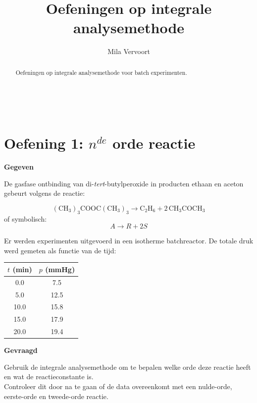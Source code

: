 \documentclass{ximera}
\title{Oefeningen op integrale analysemethode}
\author{Mila Vervoort}
\begin{document}
\begin{abstract}
    Oefeningen op integrale analysemethode voor batch experimenten.
\end{abstract}
\maketitle
\label{xim:oefeningen integrale analysemethode}

\
\section*{Oefening 1: $n^{de}$ orde reactie}

\textbf{Gegeven}

De gasfase ontbinding van di-\textit{tert}-butylperoxide in producten ethaan en aceton gebeurt volgens de reactie:

\[
(\mathrm{CH}_3)_3\mathrm{COOC}(\mathrm{CH}_3)_3 \rightarrow \mathrm{C}_2\mathrm{H}_6 + 2\,\mathrm{CH}_3\mathrm{COCH}_3
\]
of symbolisch:
\[
A \rightarrow R + 2S
\]


Er werden experimenten uitgevoerd in een isotherme batchreactor. De totale druk werd gemeten als functie van de tijd:

\begin{center}
\begin{tabular}{c|c}
$t$ (min) & $p$ (mmHg) \\
\hline
0.0 & 7.5 \\
5.0 & 12.5 \\
10.0 & 15.8 \\
15.0 & 17.9 \\
20.0 & 19.4 \\
\end{tabular}
\end{center}

\textbf{Gevraagd}

Gebruik de integrale analysemethode om te bepalen welke orde deze reactie heeft en wat de reactieconstante is. \\
Controleer dit door na te gaan of de data overeenkomt met een nulde-orde, eerste-orde en tweede-orde reactie.
\end{document}
